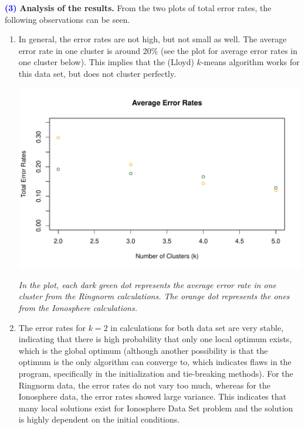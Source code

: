 \documentclass[a4paper,11pt]{article}
\newcommand{\qnum}[1]{\noindent\textcolor{blue}{\textbf{(#1)}}}
\begin{document}
\qnum{3} \textbf{Analysis of the results.}
From the two plots of total error rates, the following observations can be seen.
\begin{enumerate}
    \item In general, the error rates are not high, but not small as well. The average error rate in one cluster is around 20\% (see the plot for average error rates in one cluster below). This implies that the (Lloyd) $k$-means algorithm works for this data set, but does not cluster perfectly.
    \begin{center}
    \includegraphics[width=0.9\linewidth]{Image/Prob4-aveErrRates.pdf}
    
    \parbox{0.75\textwidth}{\small \textit{In the plot, each dark green dot represents the average error rate in one cluster from the Ringnorm calculations. The orange dot represents the ones from the Ionosphere calculations.}}
    \end{center}

    \item The error rates for $k=2$ in calculations for both data set are very stable, indicating that there is high probability that only one local optimum exists, which is the global optimum (although another possibility is that the optimum is the only algorithm can converge to, which indicates flaws in the program, specifically in the initialization and tie-breaking methods). For the Ringnorm data, the error rates do not vary too much, whereas for the Ionosphere data, the error rates showed large variance. This indicates that many local solutions exist for Ionosphere Data Set problem and the solution is highly dependent on the initial conditions. 
    
\end{enumerate}
\end{document}
